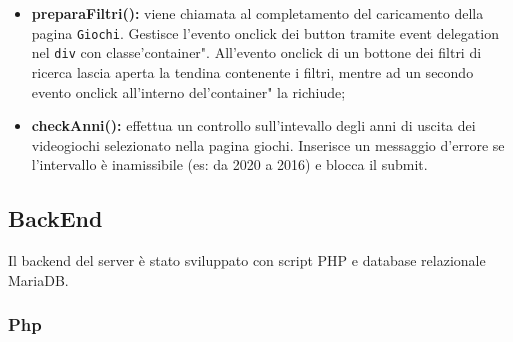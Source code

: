 \begin{itemize}
	\item \textbf{preparaFiltri(): } viene chiamata al completamento del caricamento della pagina \texttt{Giochi}. Gestisce l'evento onclick dei button tramite event delegation nel \texttt{div} con classe\n'container". All'evento onclick di un bottone dei filtri di ricerca lascia aperta la tendina contenente i filtri, mentre ad un secondo evento onclick all'interno del\n'container" la richiude; \\

	\item \textbf{checkAnni(): } effettua un controllo sull'intevallo degli anni di uscita dei videogiochi selezionato nella pagina giochi.
	Inserisce un messaggio d'errore se l'intervallo è inamissibile (es: da 2020 a 2016) e blocca il submit. \\
\end{itemize}




\subsection{BackEnd}
Il backend del server è stato sviluppato con script PHP e database relazionale MariaDB.

\subsubsection{Php}


